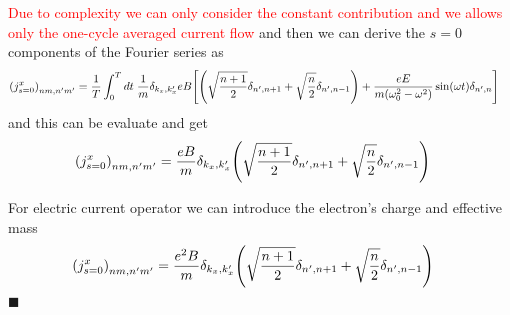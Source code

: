 \textcolor{red}{Due to complexity we can only consider the constant contribution and we allows only the one-cycle averaged current flow} and then we can derive the $s=0$ components of the Fourier series as
\begin{equation} \label{6.14}
  \begin{aligned}
    \qty({j}^x_{s=0})_{nm,n'm'} & =
    \frac{1}{T} \int_0^T dt \;
    \frac{1}{{m}}
    \delta_{k_x,k'_x}
    eB
    \qty[
    \qty(\sqrt{\frac{n+1}{2}} \delta_{n',n+1} + \sqrt{\frac{n}{2}}
    \delta_{n',n-1})
    + \frac{eE}{m(\omega_0^2 - \omega^2)}\sin(\omega t) \delta_{n',n}
    ]
  \end{aligned}
\end{equation}
and this can be evaluate and get
\begin{equation} \label{6.15}
  \begin{aligned}
    \qty({j}^x_{s=0})_{nm,n'm'} & =
    \frac{eB}{{m}}
    \delta_{k_x,k'_x}
    \qty(\sqrt{\frac{n+1}{2}} \delta_{n',n+1} + \sqrt{\frac{n}{2}}
    \delta_{n',n-1})
  \end{aligned}
\end{equation}

\noindent
For electric current operator we can introduce the electron's charge and effective mass
\begin{equation} \label{6.15}
  \begin{aligned}
    \qty({j}^x_{s=0})_{nm,n'm'} & =
    \frac{e^2B}{{m}}
    \delta_{k_x,k'_x}
    \qty(\sqrt{\frac{n+1}{2}} \delta_{n',n+1} + \sqrt{\frac{n}{2}}
    \delta_{n',n-1})
  \end{aligned}
\end{equation}
\hfill$\blacksquare$
